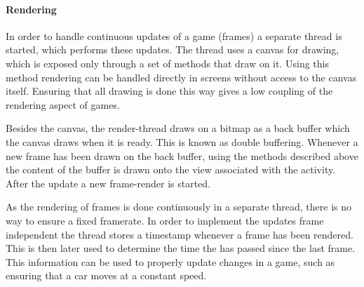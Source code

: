 \paragraph{Rendering}
In order to handle continuous updates of a game (frames) a separate thread is started, which performs these updates.
The thread uses a canvas for drawing, which is exposed only through a set of methods that draw on it.
Using this method rendering can be handled directly in screens without access to the canvas itself.
Ensuring that all drawing is done this way gives a low coupling of the rendering aspect of games.

Besides the canvas, the render-thread draws on a bitmap as a back buffer which the canvas draws when it is ready.
This is known as double buffering.
Whenever a new frame has been drawn on the back buffer, using the methods described above the content of the buffer is drawn onto the view associated with the activity.
After the update a new frame-render is started.

As the rendering of frames is done continuously in a separate thread, there is no way to ensure a fixed framerate.
In order to implement the updates frame independent the thread stores a timestamp whenever a frame has been rendered.
This is then later used to determine the time the has passed since the last frame.
This information can be used to properly update changes in a game, such as ensuring that a car moves at a constant speed.
